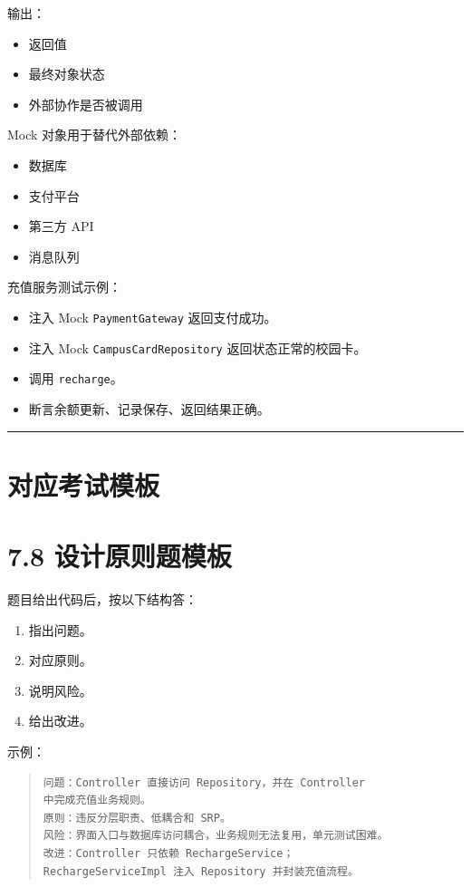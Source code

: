 \documentclass[UTF8,zihao=-4]{ctexart}
\begin{document}
输出：

\begin{itemize}
\item 返回值
\item 最终对象状态
\item 外部协作是否被调用
\end{itemize}

Mock 对象用于替代外部依赖：

\begin{itemize}
\item 数据库
\item 支付平台
\item 第三方 API
\item 消息队列
\end{itemize}

充值服务测试示例：

\begin{itemize}
\item 注入 Mock \texttt{PaymentGateway} 返回支付成功。
\item 注入 Mock \texttt{CampusCardRepository} 返回状态正常的校园卡。
\item 调用 \texttt{recharge}。
\item 断言余额更新、记录保存、返回结果正确。
\end{itemize}

\bigskip\hrule\bigskip

\section{对应考试模板}

\section{7.8 设计原则题模板}

题目给出代码后，按以下结构答：

\begin{enumerate}
\item 指出问题。
\item 对应原则。
\item 说明风险。
\item 给出改进。
\end{enumerate}

示例：

\begin{quote}
\footnotesize
\begin{verbatim}
问题：Controller 直接访问 Repository，并在 Controller 
中完成充值业务规则。
原则：违反分层职责、低耦合和 SRP。
风险：界面入口与数据库访问耦合，业务规则无法复用，单元测试困难。
改进：Controller 只依赖 RechargeService；
RechargeServiceImpl 注入 Repository 并封装充值流程。
\end{verbatim}
\end{quote}
\end{document}
